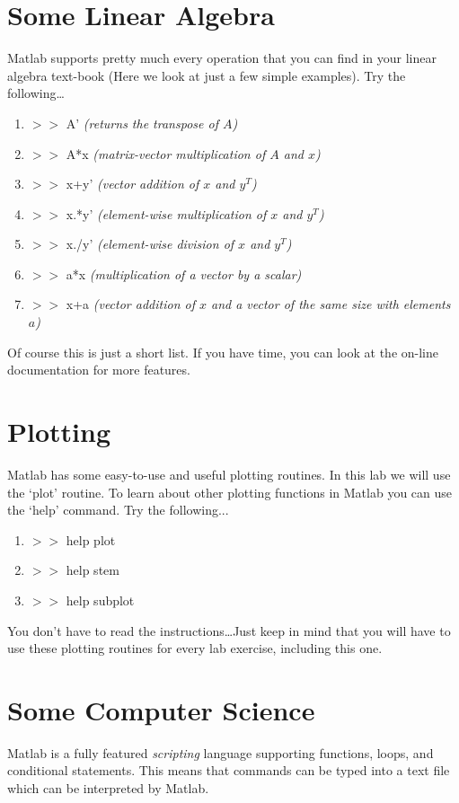 \documentclass[letter]{article}
\begin{document}
\section*{Some Linear Algebra}
Matlab supports pretty much every operation that you can find in your
linear algebra text-book (Here we look at just a few simple
examples).  Try the following\ldots
\begin{enumerate}
\small
\item $>>$ A' \emph{(returns the transpose of $A$)}
\item $>>$ A*x \emph{(matrix-vector multiplication of $A$ and $x$)}
\item $>>$ x+y' \emph{(vector addition of $x$ and $y^T$)}
\item $>>$ x.*y' \emph{(element-wise multiplication of $x$ and $y^T$)}
\item $>>$ x./y' \emph{(element-wise division of $x$ and $y^T$)}
\item $>>$ a*x \emph{(multiplication of a vector by a scalar)}
\item $>>$ x+a \emph{(vector addition of $x$ and a vector of the same
size with elements $a$)}
\end{enumerate}
Of course this is just a short list.  If you have time, you can look
at the on-line documentation for more features.

\section*{Plotting}
Matlab has some easy-to-use and useful plotting routines.  In this lab we will
use the `plot' routine.  To learn about other plotting functions in
Matlab you can use the `help' command.  Try the following...
\begin{enumerate}
\small
\item $>>$ help plot
\item $>>$ help stem
\item $>>$ help subplot
\end{enumerate}
You don't have to read the instructions\ldots Just keep in mind that
you will have to use these plotting routines for every lab exercise,
including this one.

\section*{Some Computer Science}
Matlab is a fully featured \emph{scripting} language supporting functions,
loops, and conditional statements.  This means that commands can be
typed into a text file which can be interpreted by Matlab.
\end{document}
